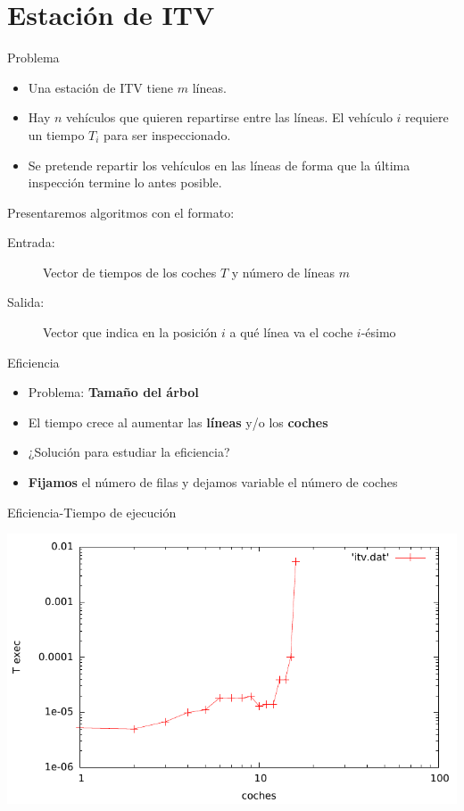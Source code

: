 \section{Estación de ITV}

\begin{frame}{Problema}
\begin{itemize}
	\item Una estación de ITV tiene $m$ líneas.
	\pause
	\item Hay $n$ vehículos que quieren repartirse entre las líneas. El vehículo $i$
	requiere un tiempo $T_i$ para ser inspeccionado.
	\pause
	\item Se pretende repartir los vehículos en las líneas de forma que la última
	inspección termine lo antes posible.
\end{itemize}
\pause

Presentaremos algoritmos con el formato:
\begin{description}
 \item[Entrada:] Vector de tiempos de los coches $T$ y número de líneas $m$
 \item[Salida:] Vector que indica en la posición $i$ a qué línea va el coche $i$-ésimo
\end{description}
\end{frame}



\begin{frame}{Eficiencia}
	\begin{itemize}
		\item Problema: \textbf{Tamaño del árbol}
		\pause
		\item El tiempo crece al aumentar las \textbf{líneas} y/o los \textbf{coches}
		\pause
		\item ¿Solución para estudiar la eficiencia?
		\pause
		\item \textbf{Fijamos} el número de filas y dejamos variable el número de coches
	\end{itemize}
\end{frame}

\begin{frame}{Eficiencia-Tiempo de ejecución}
	\begin{center}
		\includegraphics[width = \linewidth]{img/itvEficiencia}
	\end{center}
\end{frame}

